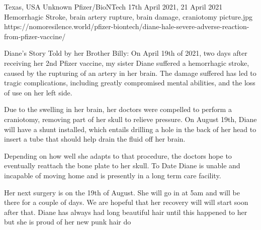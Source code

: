           {Texas, USA}
          {Unknown}
          {Pfizer/BioNTech}
          {17th April 2021, 21 April 2021}
          {Hemorrhagic Stroke, brain artery rupture, brain damage, craniotomy}
          {picture.jpg}
          {https://nomoresilence.world/pfizer-biontech/diane-hale-severe-adverse-reaction-from-pfizer-vaccine/}
          {

Diane's Story Told by her Brother Billy: On April 19th of 2021, two days after
receiving her 2nd Pfizer vaccine, my sister Diane suffered a hemorrhagic stroke,
caused by the rupturing of an artery in her brain. The damage suffered has led
to tragic complications, including greatly compromised mental abilities, and the
loss of use on her left side.

Due to the swelling in her brain, her doctors were compelled to perform a
craniotomy, removing part of her skull to relieve pressure. On August 19th,
Diane will have a shunt installed, which entails drilling a hole in the back of
her head to insert a tube that should help drain the fluid off her brain.

Depending on how well she adapts to that procedure, the doctors hope to
eventually reattach the bone plate to her skull. To Date Diane is unable and
incapable of moving home and is presently in a long term care facility.

Her next surgery is on the 19th of August. She will go in at 5am and will be
there for a couple of days. We are hopeful that her recovery will will start
soon after that. Diane has always had long beautiful hair until this happened to
her but she is proud of her new punk hair do

}
